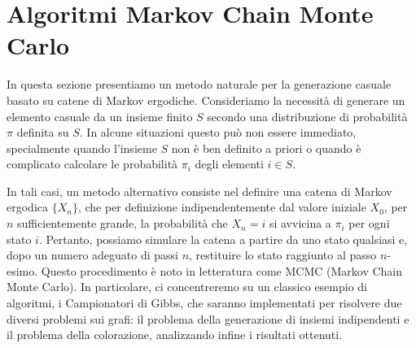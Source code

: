 \documentclass{article}
\begin{document}
\lstset{
    language=Pascal,
    keywordstyle=\bfseries,
    frame=single,
    mathescape=true
}

\section{Algoritmi Markov Chain Monte Carlo}

In questa sezione presentiamo un metodo naturale per la generazione casuale basato su catene di Markov ergodiche. Consideriamo la necessità di generare un elemento casuale da un insieme finito $ S $ secondo una distribuzione di probabilità $ \pi $ definita su $ S $. In alcune situazioni questo può non essere immediato, specialmente quando l'insieme $ S $ non è ben definito a priori o quando è complicato calcolare le probabilità $ \pi_i $ degli elementi $ i \in S $.

In tali casi, un metodo alternativo consiste nel definire una catena di Markov ergodica $ \{X_n\} $, che per definizione indipendentemente dal valore iniziale $ X_0 $, per $ n $ sufficientemente grande, la probabilità che $ X_n = i $ si avvicina a $ \pi_i $ per ogni stato $ i $. Pertanto, possiamo simulare la catena a partire da uno stato qualsiasi e, dopo un numero adeguato di passi $ n $, restituire lo stato raggiunto al passo $ n $-esimo. Questo procedimento è noto in letteratura come MCMC (Markov Chain Monte Carlo). In particolare, ci concentreremo su un classico esempio di algoritmi, i Campionatori di Gibbs, che saranno implementati per risolvere due diversi problemi sui grafi: il problema della generazione di insiemi indipendenti e il problema della colorazione, analizzando infine i risultati ottenuti.
\end{document}
